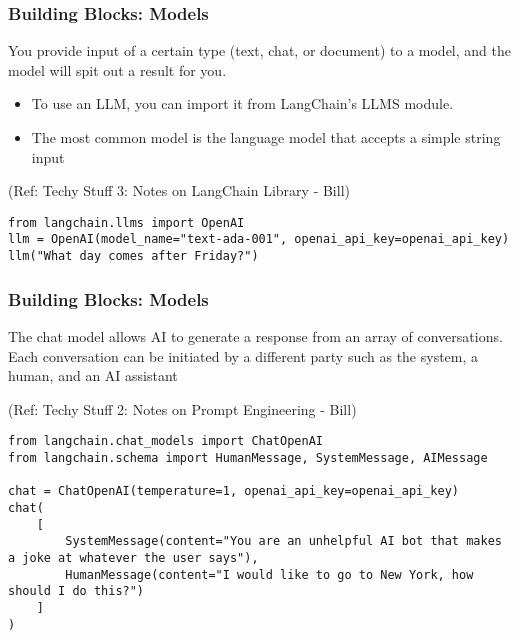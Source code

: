 \begin{frame}[fragile]\frametitle{Building Blocks: Models}

You provide input of a certain type (text, chat, or document) to a model, and the model will spit out a result for you.

\begin{itemize}
\item To use an LLM, you can import it from LangChain’s LLMS module.
\item The most common model is the language model that accepts a simple string input
\end{itemize}

{\tiny (Ref: Techy Stuff 3: Notes on LangChain Library - Bill)}

\begin{lstlisting}
from langchain.llms import OpenAI
llm = OpenAI(model_name="text-ada-001", openai_api_key=openai_api_key)
llm("What day comes after Friday?")
\end{lstlisting}	  


\end{frame}

\begin{frame}[fragile]\frametitle{Building Blocks: Models}

 The chat model allows AI to generate a response from an array of conversations. Each conversation can be initiated by a different party such as the system, a human, and an AI assistant

{\tiny (Ref: Techy Stuff 2: Notes on Prompt Engineering - Bill)}

\begin{lstlisting}
from langchain.chat_models import ChatOpenAI
from langchain.schema import HumanMessage, SystemMessage, AIMessage

chat = ChatOpenAI(temperature=1, openai_api_key=openai_api_key)
chat(
    [
        SystemMessage(content="You are an unhelpful AI bot that makes a joke at whatever the user says"),
        HumanMessage(content="I would like to go to New York, how should I do this?")
    ]
)
\end{lstlisting}	  
\end{frame}



